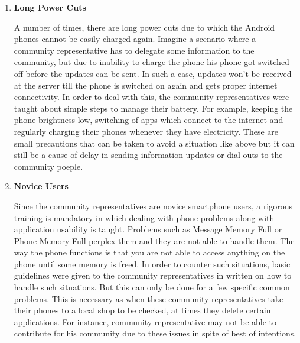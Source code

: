\begin{itemize}
\begin {enumerate}
The internet connectivity in the areas where the app is operated is often not good. Even though many a times there is network available on the phone, internet connectivity speeds can be very low. Due to no internet connectivity or slower speeds, there might be delay in the time when the text updates or dial outs are received at the community level. Also, large audio announcements in MBs will take more time to upload on the server and requires continuous net connectivity. On flaky networks, it will result in repeated failures while uploading. A continuous net connectivity will help in smooth uploading of the audio files. Rest, all functionalities require change of text data which will work in poor connectivity areas or when app user comes in affinity of the internet, data can be exchanged over the network.

\item \textbf{ Long Power Cuts}

A number of times, there are long power cuts due to which the Android phones cannot be easily charged again. Imagine a scenario where a community representative has to delegate some information to the community, but due to inability to charge the phone his phone got switched off before the updates can be sent. In such a case, updates won’t be received at the server till the phone is switched on again and gets proper internet connectivity. In order to deal with this, the community representatives were taught about simple steps to manage their battery. For example, keeping the phone brightness low, switching of apps which connect to the internet and regularly charging their phones whenever they have electricity. These are small precautions that can be taken to avoid a situation like above but it can still be a
cause of delay in sending information updates or dial outs to the community poeple.

\item \textbf {Novice Users}

Since the community representatives are novice smartphone users, a rigorous training is mandatory in which dealing with phone problems along with application usability is taught. Problems such as Message Memory Full or Phone Memory Full perplex them and they are not able to handle them. The way the phone functions is that you are not able to access anything on the phone until some memory is freed. In order to counter such situations, basic guidelines were given to the community representatives in written on how to handle such situations. But this can only be done for a few specific common problems. This is necessary as when these community representatives take their phones to a local shop to be checked, at times they delete certain applications. For instance, community representative may not be able to contribute for his community due to these issues in spite of best of intentions.



\end{enumerate}
\end{itemize}
